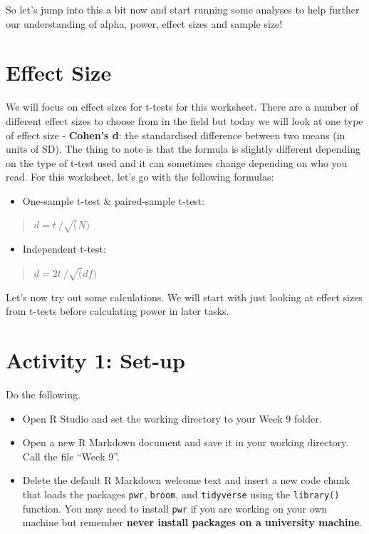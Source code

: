\documentclass[]{book}
\providecommand{\tightlist}{%
  \setlength{\itemsep}{0pt}\setlength{\parskip}{0pt}}
\begin{document}
So let's jump into this a bit now and start running some analyses to help further our understanding of alpha, power, effect sizes and sample size!

\hypertarget{effect-size}{%
\section{Effect Size}\label{effect-size}}

We will focus on effect sizes for t-tests for this worksheet. There are a number of different effect sizes to choose from in the field but today we will look at one type of effect size - \textbf{Cohen's d}: the standardised difference between two means (in units of SD). The thing to note is that the formula is slightly different depending on the type of t-test used and it can sometimes change depending on who you read. For this worksheet, let's go with the following formulas:

\begin{itemize}
\tightlist
\item
  One-sample t-test \& paired-sample t-test:
\end{itemize}

\begin{quote}
\(d = t\ / \sqrt(N)\)
\end{quote}

\begin{itemize}
\tightlist
\item
  Independent t-test:
\end{itemize}

\begin{quote}
\(d = 2t\ / \sqrt(df)\)
\end{quote}

Let's now try out some calculations. We will start with just looking at effect sizes from t-tests before calculating power in later tasks.

\hypertarget{activity-1-set-up-9}{%
\section{Activity 1: Set-up}\label{activity-1-set-up-9}}

Do the following.

\begin{itemize}
\tightlist
\item
  Open R Studio and set the working directory to your Week 9 folder.\\
\item
  Open a new R Markdown document and save it in your working directory. Call the file ``Week 9''.\\
\item
  Delete the default R Markdown welcome text and insert a new code chunk that loads the packages \texttt{pwr}, \texttt{broom}, and \texttt{tidyverse} using the \texttt{library()} function. You may need to install \texttt{pwr} if you are working on your own machine but remember \textbf{never install packages on a university machine}.
\end{itemize}
\end{document}
